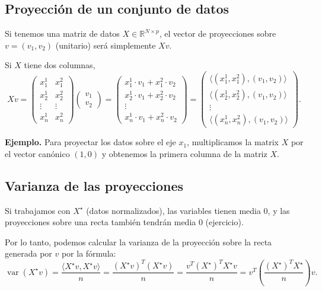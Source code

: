 \documentclass[a4paper]{article}
\DeclareMathOperator{\var}{var}
\newcommand{\R}{{\mathbb R}}
\begin{document}
\subsection{Proyección de un conjunto de datos}

Si tenemos una matriz de datos $X \in \R^{N \times p}$, el vector de proyecciones sobre $v = (v_1, v_2)$ (unitario) ser\'a simplemente $Xv$.

Si $X$ tiene dos columnas, 
$$
Xv =
\begin{pmatrix} x^1_1 & x^2_1 \\ x^1_2 & x^2_2 \\ \vdots & \vdots \\ x^1_n & x^2_n \end{pmatrix}
\begin{pmatrix} v_1 \\ v_2 \end{pmatrix} =
\begin{pmatrix} x^1_1 \cdot v_1 + x^2_1 \cdot v_2 \\ x^1_2 \cdot v_1 + x^2_2 \cdot v_2 \\ \vdots \\ x^1_n \cdot v_1 + x^2_n \cdot v_2 \end{pmatrix} =
\begin{pmatrix} \langle (x^1_1, x^2_1), (v_1, v_2) \rangle \\ \langle (x^1_2, x^2_2), (v_1, v_2) \rangle  \\ \vdots \\ \langle (x^1_n, x^2_n), (v_1, v_2) \rangle \end{pmatrix}.
$$

\textbf{Ejemplo.} Para proyectar los datos sobre el eje $x_1$, multiplicamos la matrix $X$ por el vector canónico $(1,0)$ y obtenemos la primera columna de la matriz $X$.

\subsection{Varianza de las proyecciones}

Si trabajamos con $X^\star$ (datos normalizados), las variables tienen media 0, y las proyecciones sobre una recta también tendrán media 0 (ejercicio).

Por lo tanto, podemos calcular la varianza de la proyección sobre la recta generada por $v$ por la fórmula:
$$
\var(X^\star v) = \frac{\langle X^\star v, X^\star v \rangle}{n} = \frac{(X^\star v)^T (X^\star v)}{n} = \frac{v^T (X^\star)^T X^\star v}{n} = v^T \left(\frac{(X^\star)^T X^\star}{n}\right) v.
$$
\end{document}
